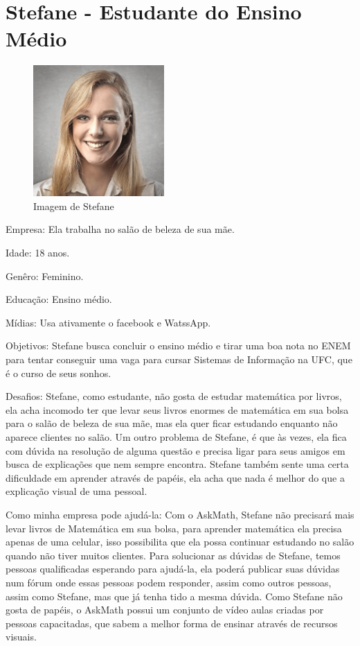\section{Stefane - Estudante do Ensino Médio}

\begin{figure}[H]
\centering
\includegraphics[width=5cm]{figuras/personas/figura_persona_4}
\caption{Imagem de Stefane}
\label{figura_persona_4}
\end{figure}

Empresa: Ela trabalha no salão de beleza de sua mãe.

Idade: 18 anos.

Genêro: Feminino.

Educação: Ensino médio.

Mídias: Usa ativamente o facebook e WatssApp.

Objetivos: Stefane busca concluir o ensino médio e tirar uma boa nota no ENEM 
para tentar conseguir uma vaga para cursar Sistemas de Informação na UFC, que é 
o curso de seus sonhos.

Desafios: Stefane, como estudante, não gosta de estudar matemática por livros, 
ela acha incomodo ter que levar seus livros enormes de matemática em sua bolsa 
para o salão de beleza de sua mãe, mas ela quer ficar estudando enquanto não 
aparece clientes no salão. Um outro problema de Stefane, é que às vezes, ela 
fica com dúvida na resolução de alguma questão e precisa ligar para seus amigos 
em busca de explicações que nem sempre encontra. Stefane também sente uma certa 
dificuldade em aprender através de papéis, ela acha que nada é melhor do que a 
explicação visual de uma pessoal.

Como minha empresa pode ajudá-la: Com o AskMath, Stefane não precisará mais
levar livros de Matemática em sua bolsa, para aprender matemática ela precisa 
apenas de uma celular, isso possibilita que ela possa continuar estudando no 
salão quando não tiver muitos clientes. Para solucionar as dúvidas de Stefane, 
temos pessoas qualificadas esperando para ajudá-la, ela poderá publicar suas 
dúvidas num fórum onde essas pessoas podem responder, assim como outros 
pessoas, assim como Stefane, mas que já tenha tido a mesma dúvida. Como Stefane 
não gosta de papéis, o AskMath possui um conjunto de vídeo aulas criadas por 
pessoas capacitadas, que sabem a melhor forma de ensinar através de recursos 
visuais.